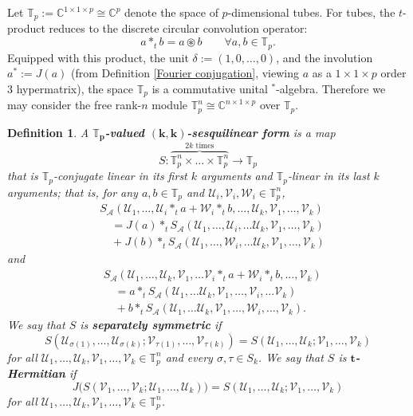 \documentclass[11pt]{article}
\newtheorem{defn}[theorem]{Definition}
\begin{document}
Let $\mathbb{T}_p := \mathbb{C}^{1\times 1\times p}\cong \mathbb{C}^p$ denote the space of $p$-dimensional tubes. For tubes, the $t$-product reduces to the discrete circular convolution operator: 
\[a*_tb = a\circledast b\qquad \forall a,b\in \mathbb{T}_p.\]
Equipped with this product, the unit $\delta := (1,0,\dots,0)$, and the involution $a^* := J(a)$ (from Definition \ref{Fourier conjugation}, viewing $a$ as a $1\times 1\times p$ order $3$ hypermatrix), the space $\mathbb{T}_p$ is a commutative unital $^*$-algebra. Therefore we may consider the free rank-$n$ module $\mathbb{T}_p^n \cong \mathbb{C}^{n\times 1\times p}$ over $\mathbb{T}_p$. 
\begin{defn}
    A \textbf{$\boldsymbol{\mathbb{T}_p}$-valued $\boldsymbol{(k,k)}$-sesquilinear form} is a map 
    \[S:\overbrace{\mathbb{T}_p^n\times\dots\times \mathbb{T}_p^n}^{2k\text{ times}}\rightarrow \mathbb{T}_p\]
    that is $\mathbb{T}_p$-conjugate linear in its first $k$ arguments and $\mathbb{T}_p$-linear in its last $k$ arguments; that is, 
    for any $a,b\in \mathbb{T}_p$ and $\mathcal{U}_i,\mathcal{V}_i,\mathcal{W}_i\in \mathbb{T}_p^n$, 
    \begin{align*}
        &S_{\mathcal{A}}(\mathcal{U}_1,\dots,\mathcal{U}_i*_ta+\mathcal{W}_i*_tb,\dots,\mathcal{U}_k,\mathcal{V}_1,\dots,\mathcal{V}_k) \\
        &\quad = J(a)*_tS_{\mathcal{A}}(\mathcal{U}_1,\dots,\mathcal{U}_i,\dots\mathcal{U}_k,\mathcal{V}_1,\dots,\mathcal{V}_k) \\
        &\quad + J(b)*_tS_{\mathcal{A}}(\mathcal{U}_1,\dots,\mathcal{W}_i,\dots\mathcal{U}_k,\mathcal{V}_1,\dots,\mathcal{V}_k)
    \end{align*}
    and 
    \begin{align*}
        &S_{\mathcal{A}}(\mathcal{U}_1,\dots,\mathcal{U}_k,\mathcal{V}_1,\dots\mathcal{V}_i*_ta+\mathcal{W}_i*_tb,\dots,\mathcal{V}_k) \\
        &\quad = a*_tS_{\mathcal{A}}(\mathcal{U}_1,\dots\mathcal{U}_k,\mathcal{V}_1,\dots,\mathcal{V}_i,\dots\mathcal{V}_k) \\
        &\quad + b*_tS_{\mathcal{A}}(\mathcal{U}_1,\dots\mathcal{U}_k,\mathcal{V}_1,\dots,\mathcal{W}_i,\dots,\mathcal{V}_k).
    \end{align*}
    We say that $S$ is \textbf{separately symmetric} if 
    \[S(\mathcal{U}_{\sigma(1)},\dots,\mathcal{U}_{\sigma(k)};\mathcal{V}_{\tau(1)},\dots,\mathcal{V}_{\tau(k)}) = S(\mathcal{U}_1,\dots,\mathcal{U}_k;\mathcal{V}_1,\dots,\mathcal{V}_k)\]
    for all $\mathcal{U}_1,\dots,\mathcal{U}_k,\mathcal{V}_1,\dots,\mathcal{V}_k\in \mathbb{T}_p^n$ and every $\sigma,\tau\in S_k$. We say that $S$ is \textbf{$\boldsymbol{t}$-Hermitian} if 
    \[J\big(S(\mathcal{V}_1,\dots,\mathcal{V}_k;\mathcal{U}_1,\dots,\mathcal{U}_k)\big) = S(\mathcal{U}_1,\dots,\mathcal{U}_k;\mathcal{V}_1,\dots,\mathcal{V}_k)\]
    for all $\mathcal{U}_1,\dots,\mathcal{U}_k,\mathcal{V}_1,\dots,\mathcal{V}_k\in \mathbb{T}_p^n$. 
\end{defn}
\end{document}
